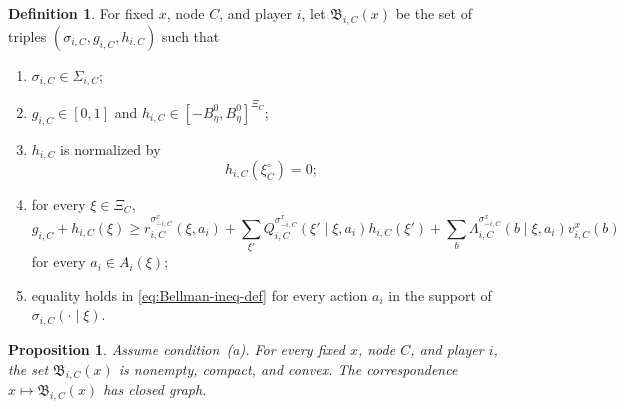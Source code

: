 \documentclass[12pt]{article}
\newtheorem{proposition}[theorem]{Proposition}
\theoremstyle{definition}
\newtheorem{definition}[theorem]{Definition}
\newcommand{\1}{\mathbf{1}}
\begin{document}
\begin{definition}
\label{def:local-BR-set}
For fixed $x$, node $C$, and player $i$, let $\mathfrak B_{i,C}(x)$ be the set of
triples $(\sigma_{i,C},g_{i,C},h_{i,C})$ such that
\begin{enumerate}[label=\textnormal{(BR\arabic*)},leftmargin=2.9em]
\item $\sigma_{i,C}\in \Sigma_{i,C}$;
\item $g_{i,C}\in[0,1]$ and $h_{i,C}\in[-B_\eta^0,B_\eta^0]^{\Xi_C}$;
\item $h_{i,C}$ is normalized by
\[
h_{i,C}(\xi_C^\circ)=0;
\]
\item for every $\xi\in\Xi_C$,
\begin{equation}
\label{eq:Bellman-ineq-def}
g_{i,C}+h_{i,C}(\xi)
\ge
r_{i,C}^{\sigma_{-i,C}^x}(\xi,a_i)
+
\sum_{\xi'}Q_{i,C}^{\sigma_{-i,C}^x}(\xi'\mid\xi,a_i)h_{i,C}(\xi')
+
\sum_b \Lambda_{i,C}^{\sigma_{-i,C}^x}(b\mid\xi,a_i)v_{i,C}^x(b)
\end{equation}
for every $a_i\in A_i(\xi)$;
\item equality holds in \eqref{eq:Bellman-ineq-def} for every action $a_i$ in the
support of $\sigma_{i,C}(\cdot\mid\xi)$.
\end{enumerate}
\end{definition}

\begin{proposition}
\label{prop:local-BR}
Assume condition~\textnormal{(a)}. For every fixed $x$, node $C$, and player $i$,
the set $\mathfrak B_{i,C}(x)$ is nonempty, compact, and convex. The
correspondence $x\mapsto \mathfrak B_{i,C}(x)$ has closed graph.
\end{proposition}
\end{document}
